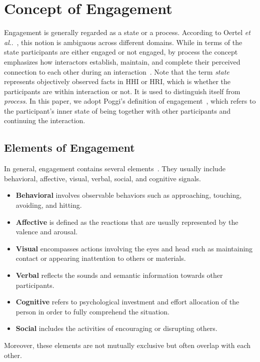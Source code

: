 \documentclass[VANCOUVER,STIX1COL]{WileyNJD-v2}
\makeatletter
\DeclareRobustCommand\onedot{\futurelet\@let@token\@onedot}
\def\@onedot{\ifx\@let@token.\else.\null\fi\xspace}
\def\etal{\emph{et al}\onedot}
\makeatother
\begin{document}
\section{Concept of Engagement}
\label{subs:What_Is_Engagement}

Engagement is generally regarded as a state or a process. According to Oertel \etal~\cite{Oertel2020Engagement}, this notion is ambiguous across different domains. While in terms of the state participants are either engaged or not engaged, by process the concept emphasizes how interactors establish, maintain, and complete their perceived connection to each other during an interaction~\cite{Sidner2005Explorations}. Note that the term {\em state} represents objectively observed facts in HHI or HRI, which is whether the participants are within interaction or not. It is used to distinguish itself from \textit{process}. In this paper, we adopt Poggi's definition of engagement~\cite{Poggi2013Mind}, which refers to the participant's inner state of being together with other participants and continuing the interaction.

\subsection{Elements of Engagement}
In general, engagement contains several elements~\cite{Castellano2009Detecting,Guhan2020ABCNet,Sumer2021Multimodal,Finn2012Student, OBrien2008What,CohenMansfield2011Comprehensive,Archambault2017Joint,BenEliyahu2018Investigating,Corrigan2016Engagement,Perugia2020ENGAGEDEM}. They usually include behavioral, affective, visual, verbal, social, and cognitive signals.
\begin{itemize}
  \item \textbf{Behavioral} involves observable behaviors such as approaching, touching, avoiding, and hitting.
  \item \textbf{Affective} is defined as the reactions that are usually represented by the valence and arousal.
  \item \textbf{Visual} encompasses actions involving the eyes and head such as maintaining contact or appearing inattention to others or materials.
  \item \textbf{Verbal} reflects the sounds and semantic information towards other participants.
  \item \textbf{Cognitive} refers to psychological investment and effort allocation of the person in order to fully comprehend the situation.
  \item \textbf{Social} includes the activities of encouraging or disrupting others.
\end{itemize}
Moreover, these elements are not mutually exclusive but often overlap with each other.
\end{document}
